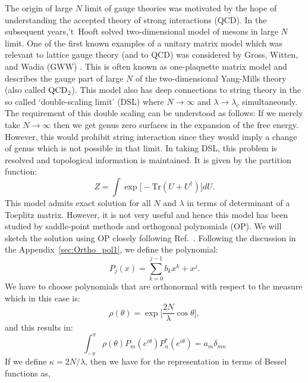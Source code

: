 \documentclass[11pt]{article}
\begin{document}
The origin of large $N$ limit of gauge theories was motivated by the hope of understanding 
the accepted theory of strong interactions (QCD). 
In the subsequent years,'t~Hooft solved two-dimensional model of mesons in large $N$ 
limit. One of the first known examples of a unitary matrix model which was relevant to 
lattice gauge theory (and to QCD) was considered by Gross, Witten, and 
Wadia (GWW) \cite{Gross:1980he, Wadia:2012fr}.
This is often known as one-plaquette matrix model and describes 
the gauge part of large $N$ of the two-dimensional Yang-Mills theory (also called $\rm{QCD}_{2}$).
This model also has deep connections to string theory in the so 
called `double-scaling limit' (DSL) where $N \to \infty$ and $\lambda \to \lambda_{c}$ 
simultaneously. The requirement of this double scaling can be understood as follows: 
If we merely take $N \to \infty$ then we get genus zero surfaces in the 
expansion of the free energy. However, this would prohibit string interaction 
since they would imply a change of genus which is not possible in that limit. 
In taking DSL, this problem is resolved and topological information is maintained. 
It is given by the partition function: 
\begin{equation}
	Z = \int \exp \Big[- \mbox{Tr} (U + U^{\dagger})   \Big] dU. 
\end{equation}
This model admits exact solution for all $N$ and $\lambda$ in terms of determinant of a 
Toeplitz matrix. However, it is not very useful and hence this model has been studied by 
saddle-point methods and orthogonal polynomials (OP). We will sketch the solution using OP 
closely following Ref.~\cite{Goldschmidt:1979hq}. 
Following the discussion in the Appendix~\ref{sec:Ortho_pol1}, we define the polynomial:
\begin{equation}
	P_{j}(x) = \sum_{k=0}^{j-1} b_{k} x^{k} + x^{j}. 
\end{equation} 
We have to choose polynomials that are orthonormal with respect to the measure which in this case is:
\begin{equation}
	\rho(\theta) = \exp\Big[\frac{2N}{\lambda} \cos \theta \Big],
\end{equation}
and this results in:
\begin{equation}
	\int_{-\pi}^{\pi} \rho(\theta) P_{m}(e^{i\theta}) P_{n}^{*}(e^{i\theta}) = a_{m} \delta_{mn}
\end{equation}
If we define $\kappa = 2N/\lambda$, then we have for the representation in terms of 
Bessel functions as, 
\end{document}
